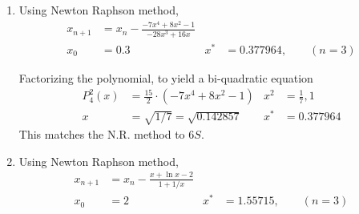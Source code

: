 \begin{enumerate}
    \item Using Newton Raphson method,
          \begin{align}
              x_{n+1} & = x_n - \frac{-7x^4 + 8x^2 - 1}
              {-28x^3 + 16x}                              \\
              x_0     & = 0.3                           &
              x^*     & = 0.377964,\qquad (n=3)
          \end{align}
          \begin{figure}[H]
              \centering
          \end{figure}
          Factorizing the polynomial, to yield a bi-quadratic equation
          \begin{align}
              P_4^2(x) & = \frac{15}{2} \cdot (-7x^4 + 8x^2 - 1) &
              x^2      & = \frac{1}{7}, 1                          \\
              x        & = \sqrt{1/7} = \sqrt{0.142857}          &
              x^*      & = 0.377964
          \end{align}
          This matches the N.R. method to $ 6S $.

    \item Using Newton Raphson method,
          \begin{align}
              x_{n+1} & = x_n - \frac{x + \ln x - 2}
              {1 + 1/x}                                \\
              x_0     & = 2                          &
              x^*     & = 1.55715,\qquad (n=3)
          \end{align}
          \begin{figure}[H]
              \centering
          \end{figure}


\end{enumerate}
